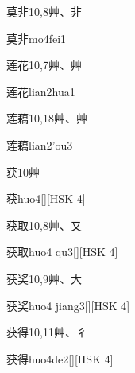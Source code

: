 \begin{entry}{莫非}{10,8}{⾋、⾮}
  \begin{phonetics}{莫非}{mo4fei1}
  \end{phonetics}
\end{entry}

\begin{entry}{莲花}{10,7}{⾋、⾋}
  \begin{phonetics}{莲花}{lian2hua1}
  \end{phonetics}
\end{entry}

\begin{entry}{莲藕}{10,18}{⾋、⾋}
  \begin{phonetics}{莲藕}{lian2'ou3}
  \end{phonetics}
\end{entry}

\begin{entry}{获}{10}{⾋}
  \begin{phonetics}{获}{huo4}[][HSK 4]
  \end{phonetics}
\end{entry}

\begin{entry}{获取}{10,8}{⾋、⼜}
  \begin{phonetics}{获取}{huo4 qu3}[][HSK 4]
  \end{phonetics}
\end{entry}

\begin{entry}{获奖}{10,9}{⾋、⼤}
  \begin{phonetics}{获奖}{huo4 jiang3}[][HSK 4]
  \end{phonetics}
\end{entry}

\begin{entry}{获得}{10,11}{⾋、⼻}
  \begin{phonetics}{获得}{huo4de2}[][HSK 4]
  \end{phonetics}
\end{entry}

